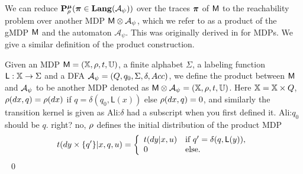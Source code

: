 \documentclass{ifacconf}
\newcommand{\red}[1]{{\color{red} #1}}
\renewcommand{\axx}[1]{{\color{orange} Ali:#1}}
\begin{document}
We can
reduce $\mathbf{P}_\rho^{\boldsymbol{\mu}}
({\boldsymbol{\pi}} \in\mathbf{Lang} (\mathcal A_\psi))$  over the traces ${\boldsymbol{\pi}}$ of $\mathsf{M}$ to the reachability problem
 over another MDP   $\mathsf{M}\otimes\mathcal A_\psi$, which we refer to as a product of the gMDP $\mathsf{M}$ and the automaton $\mathcal A_\psi$. This was originally derived in \citep{tmka2013} for MDPs. We give a similar definition of the product construction.
%
\begin{definition}
\label{def:product}
Given an MDP  $\mathsf{M} = ({\mathbb{X}}, \rho, t, {\mathbb{U}})$,
a finite alphabet $\Sigma$,
a labeling function $\mathsf{L}:{\mathbb{X}}\rightarrow\Sigma$
and a DFA  $\mathcal{A}_\psi = (Q, q_0, \Sigma, \delta, Acc)$,
we define the product between $\mathsf{M}$ and $\mathcal{A}_\psi$ to be another MDP denoted as
$\mathsf{M}\otimes\mathcal{A}_\psi = (\relax {\mathbb{X}}, \relax\rho,\relax{t},{\mathbb{U}})$.
Here $\relax {\mathbb{X}}= {\mathbb{X}}\times Q$, $\relax\rho(dx,q) = \rho(dx)$ if $q= \delta(q_0,\mathsf L(x))$ else $ \relax\rho(dx,q) =0$, and similarly the transition kernel is given as \axx{$\delta$ had a subscript when you first defined it.}
\axx{$q_0$ should be $q$. right?}\red{ no, $\relax\rho$ defines the initial distribution of the product MDP}
\begin{equation*}
  \relax{t}(d y\times\{q'\}|x,q,u) =  \left\{\begin{array}{ll}t(dy|x,u)& \text{if } q' =\delta(q,\mathsf{L}(y)),\\ 0 & \text{else.}  \end{array}\right.
\end{equation*} 
\hfill \mbox{ }\qed
\end{definition}

\end{document}
